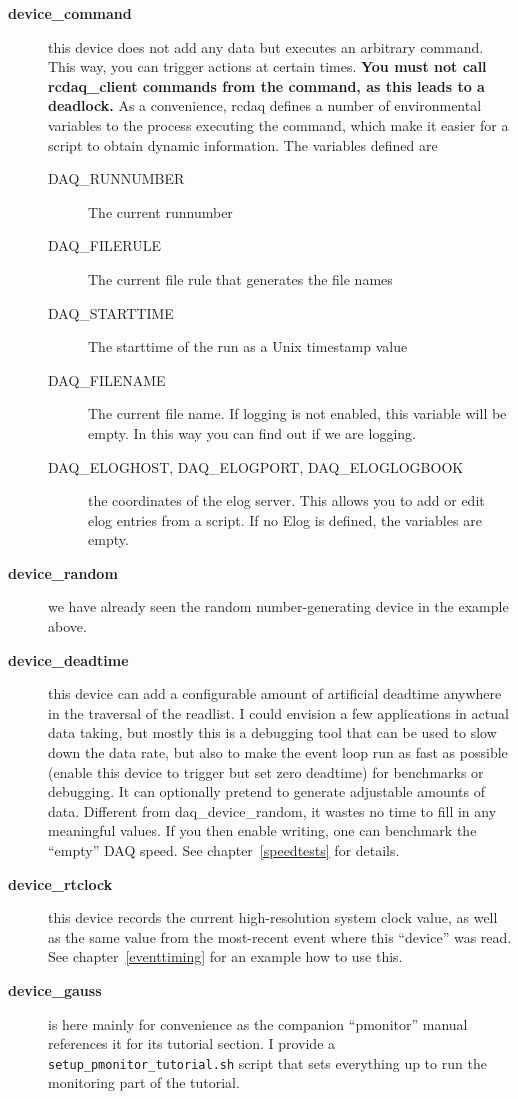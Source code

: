 \documentclass{article}[11pt]
\begin{document}
\begin{description}
\item[\bf device\_command] this device does not add any data but executes
  an arbitrary command.  This way, you can trigger actions at certain
  times.  {\bf You must not call rcdaq\_client commands from the
    command, as this leads to a deadlock.} As a convenience, rcdaq
  defines a number of environmental variables to the process executing
  the command, which make it easier for a script to obtain dynamic
  information. The variables defined are \label{environment}
  \begin{description}
  \item[DAQ\_RUNNUMBER] The current runnumber
    
  \item[DAQ\_FILERULE]  The current file rule that generates the file names 
    
  \item[DAQ\_STARTTIME] The starttime of the run as a Unix timestamp value
    
  \item[DAQ\_FILENAME] The current file name. If logging is not
    enabled, this variable will be empty. In this way you can find out
    if we are logging.
    
  \item[DAQ\_ELOGHOST, DAQ\_ELOGPORT, DAQ\_ELOGLOGBOOK] the coordinates
    of the elog server. This allows you to add or edit elog entries
    from a script. If no Elog is defined, the variables are empty. 
  \end{description}

\item[\bf device\_random] we have already seen the random
  number-generating device in the example above.

  
\item[\bf device\_deadtime] this device can add a configurable amount
  of artificial deadtime anywhere in the traversal of the readlist.  I
  could envision a few applications in actual data taking, but mostly
  this is a debugging tool that can be used to slow down the data
  rate, but also to make the event loop run as fast as possible
  (enable this device to trigger but set zero deadtime) for benchmarks
  or debugging. It can optionally pretend to generate adjustable
  amounts of data. Different from daq\_device\_random, it wastes no
  time to fill in any meaningful values. If you then enable writing,
  one can benchmark the ``empty'' DAQ speed. See
  chapter~\ref{speedtests} for details.

\item[\bf device\_rtclock] this device records the current
  high-resolution system clock value, as well as the same value from
  the most-recent event where this ``device'' was read. See
  chapter~\ref{eventtiming} for an example how to use this. 

\item[\bf device\_gauss] is here mainly for convenience as the
  companion ``pmonitor'' manual references it for its tutorial
  section. I provide a \verb|setup_pmonitor_tutorial.sh| script that
  sets everything  up to run the monitoring part of the tutorial.
  
\end{description}
\end{document}
